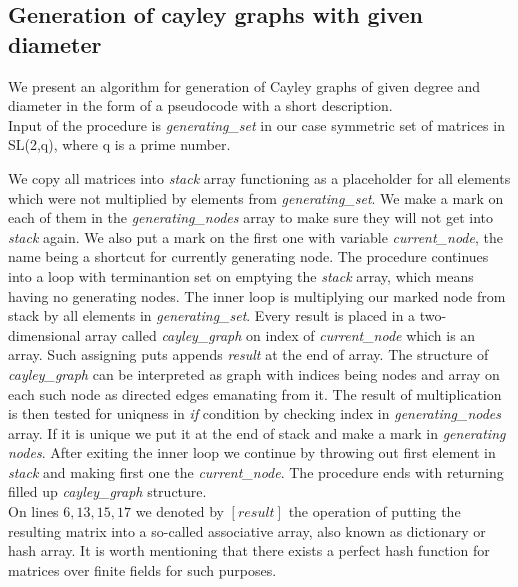 \documentclass[a4paper,12pt,oneside]{report}%
\begin{document}
\lstset{
	basicstyle=\footnotesize,
	tabsize=2
}

\subsection{Generation of cayley graphs with given diameter}

We present an algorithm for generation of Cayley graphs of given degree and diameter in the form of a pseudocode with a short description. ~ \\
Input of the procedure is {\em generating\_set} in our case symmetric set of matrices in SL(2,q), where q is a prime number.

We copy all matrices into {\em stack} array functioning as a placeholder for all elements which were not multiplied by elements from {\em generating\_set}. We make a mark on each of them in the  {\em generating\_nodes} array to make sure they will not get into {\em stack} again. We also put a mark on the first one with variable {\em current\_node}, the name being a shortcut for currently generating node. The procedure continues into a loop with terminantion set on emptying the {\em stack} array, which means having no generating nodes. The inner loop is multiplying our marked node from stack by all elements in {\em generating\_set}. Every result is placed in a two-dimensional array called {\em cayley\_graph} on index of {\em current\_node} which is an array. Such assigning puts appends {\em result} at the end of array. The structure of {\em cayley\_graph} can be interpreted as graph with indices being nodes and array on each such node as directed edges emanating from it. The result of multiplication is then tested for uniqness in {\em if} condition by checking index in {\em generating\_nodes} array. If it is unique we put it at the end of stack and make a mark in {\em generating nodes}. After exiting the inner loop we continue by throwing out first element in {\em stack} and making first one the {\em current\_node}. The procedure ends with returning filled up {\em cayley\_graph} structure.  ~\\



On lines $6,13,15,17$ we denoted by $[ result ]$  the operation of putting the resulting matrix into a so-called associative array, also known as dictionary or hash array. It is worth mentioning that there exists a perfect hash function for matrices over finite fields for such purposes.
\end{document}
